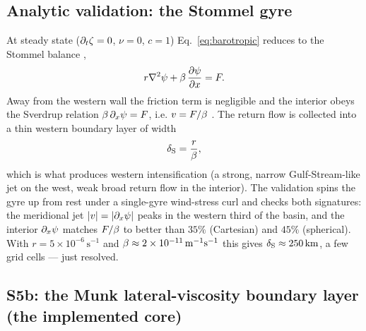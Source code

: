 \subsection*{Analytic validation: the Stommel gyre}

At steady state ($\partial_t\zeta=0$, $\nu=0$, $c=1$) Eq.~\eqref{eq:barotropic} reduces to the
Stommel balance \citep{stommel1961},
\begin{equation}\label{eq:stommel}
  r\nabla^{2}\psi+\beta\,\frac{\partial \psi}{\partial x}=F .
\end{equation}
Away from the western wall the friction term is negligible and the interior obeys the Sverdrup
relation $\beta\,\partial_x\psi=F$, i.e. $v=F/\beta$ \citep{sverdrup1947}. The return flow is collected into a thin
western boundary layer of width
\begin{equation}\label{eq:wbc}
  \delta_{\mathrm{S}}=\frac{r}{\beta},
\end{equation}
which is what produces western intensification (a strong, narrow Gulf-Stream-like jet on the
west, weak broad return flow in the interior). The validation spins the gyre up from rest under
a single-gyre wind-stress curl and checks both signatures: the meridional jet $|v|=|\partial_x\psi|$
peaks in the western third of the basin, and the interior $\partial_x\psi$ matches $F/\beta$ to
better than $35\%$ (Cartesian) and $45\%$ (spherical). With $r=5\times10^{-6}\,\mathrm{s^{-1}}$
and $\beta\approx2\times10^{-11}\,\mathrm{m^{-1}s^{-1}}$ this gives $\delta_{\mathrm{S}}\approx250\,\mathrm{km}$, a
few grid cells --- just resolved.

\subsection*{S5b: the Munk lateral-viscosity boundary layer (the implemented core)}


